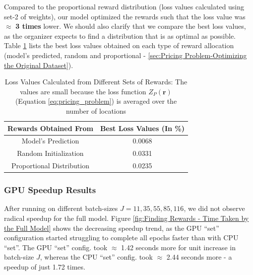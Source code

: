 \documentclass[12pt]{article}
\newcommand{\vect}[1]{\mathbf{#1}}  %
\begin{document}
    Compared to the proportional reward distribution (loss values calculated using set-2 of weights), our model optimized the rewards such that the loss value was $\approx$ \textbf{3 times} lower. We should also clarify that we compare the best loss values, as the organizer expects to find a distribution that is as optimal as possible. Table \ref{tab:Loss Values Calculated from Different Sets of Rewards} lists the best loss values obtained on each type of reward allocation (model's predicted, random and proportional - \cref{sec:Pricing Problem-Optimizing the Original Dataset}).
    \begin{table}[!htbp]
        \centering
        \caption[Loss Values Calculated from Different Sets of Rewards]{Loss Values Calculated from Different Sets of Rewards: The values are small because the loss function $Z_P(\vect{r})$ (Equation \ref{eq:pricing_problem}) is averaged over the number of locations}
        \label{tab:Loss Values Calculated from Different Sets of Rewards}
        \begin{tabular}{|c|c|}
            \hline
            \textbf{Rewards Obtained From} & \textbf{Best Loss Values (In \%)}\\
            \hline
            Model's Prediction & 0.0068\\
            Random Initialization & 0.0331\\
            Proportional Distribution & 0.0235\\
            \hline
        \end{tabular}
    \end{table}
    
    \subsubsection{GPU Speedup Results} \label{sec:PriProbRes - GPU}
    After running on different batch-sizes $J = 11, 35, 55, 85, 116$, we did not observe radical speedup for the full model. Figure \ref{fig:Finding Rewards - Time Taken by the Full Model} shows the decreasing speedup trend, as the GPU ``set'' configuration started struggling to complete all epochs faster than with CPU ``set''. The GPU ``set'' config. took $\approx$ 1.42 seconds more for unit increase in batch-size $J$, whereas the CPU ``set'' config. took $\approx$ 2.44 seconds more - a speedup of just 1.72 times.
    
\end{document}
